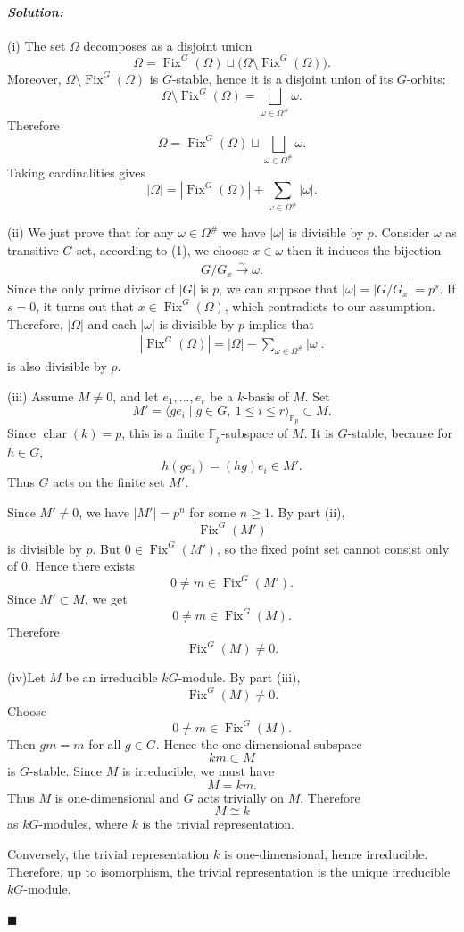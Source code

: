 \documentclass[12pt, a4paper]{article}
\theoremstyle{remark}
\newenvironment{solution}
  {\paragraph{\textit{Solution:}}\par\medskip}
  {\hfill$\blacksquare$\vspace{0.1cm}}
\begin{document}
\begin{solution}
    (i) The set \(\Omega\) decomposes as a disjoint union
\[
\Omega=\operatorname{Fix}^G(\Omega)\sqcup
\bigl(\Omega\setminus \operatorname{Fix}^G(\Omega)\bigr).
\]
Moreover, \(\Omega\setminus \operatorname{Fix}^G(\Omega)\) is \(G\)-stable, hence it is a disjoint union of its \(G\)-orbits:
\[
\Omega\setminus \operatorname{Fix}^G(\Omega)
=
\bigsqcup_{\omega\in \Omega^\#}\omega .
\]
Therefore
\[
\Omega
=
\operatorname{Fix}^G(\Omega)
\sqcup
\bigsqcup_{\omega\in \Omega^\#}\omega .
\]
Taking cardinalities gives
\[
|\Omega|
=
|\operatorname{Fix}^G(\Omega)|
+
\sum_{\omega\in \Omega^\#}|\omega|.
\]

(ii) We just prove that for any $\omega\in \Omega^\#$ we have $|\omega|$ is divisible by $p$. Consider $\omega$ as transitive $G$-set, according to (1), we choose $x\in \omega$ then it induces the bijection
\begin{align*}
    G/G_x \xrightarrow{\sim} \omega.
\end{align*}
Since the only prime divisor of $|G|$ is $p$, we can suppsoe that $|\omega|= |G/G_x|=p^s.$ If $s=0$, it turns out that $x\in \operatorname{Fix}^G(\Omega)$, which contradicts to our assumption.
Therefore, $|\Omega|$ and each $|\omega|$ is divisible by $p$ implies that 
\begin{align*}
|\operatorname{Fix}^G(\Omega)| =  |\Omega| - \sum_{\omega\in \Omega^\#}|\omega|.
\end{align*}
is also divisible by $p$.

(iii) Assume \(M\neq 0\), and let \(e_1,\dots,e_r\) be a \(k\)-basis of \(M\).
Set
\[
M'=\langle ge_i\mid g\in G,\ 1\leq i\leq r\rangle_{\mathbb F_p}\subset M.
\]
Since \(\operatorname{char}(k)=p\), this is a finite \(\mathbb F_p\)-subspace of
\(M\). It is \(G\)-stable, because for \(h\in G\),
\[
h(ge_i)=(hg)e_i\in M'.
\]
Thus \(G\) acts on the finite set \(M'\).

Since \(M'\neq 0\), we have \(|M'|=p^n\) for some \(n\geq 1\). By part (ii),
\[
|\operatorname{Fix}^G(M')|
\]
is divisible by \(p\). But \(0\in \operatorname{Fix}^G(M')\), so the fixed
point set cannot consist only of \(0\). Hence there exists
\[
0\neq m\in \operatorname{Fix}^G(M').
\]
Since \(M'\subset M\), we get
\[
0\neq m\in \operatorname{Fix}^G(M).
\]
Therefore
\[
\operatorname{Fix}^G(M)\neq 0.
\]

(iv)Let \(M\) be an irreducible \(kG\)-module. By part (iii),
\[
\operatorname{Fix}^G(M)\neq 0.
\]
Choose
\[
0\neq m\in \operatorname{Fix}^G(M).
\]
Then \(gm=m\) for all \(g\in G\). Hence the one-dimensional subspace
\[
km\subset M
\]
is \(G\)-stable. Since \(M\) is irreducible, we must have
\[
M=km.
\]
Thus \(M\) is one-dimensional and \(G\) acts trivially on \(M\). Therefore
\[
M\cong k
\]
as \(kG\)-modules, where \(k\) is the trivial representation.

Conversely, the trivial representation \(k\) is one-dimensional, hence
irreducible. Therefore, up to isomorphism, the trivial representation is the
unique irreducible \(kG\)-module.


\end{solution}
\end{document}
